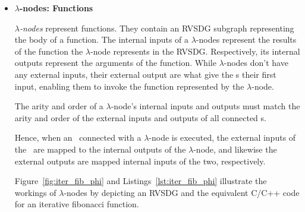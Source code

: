 \begin{itemize}
\item \textbf{$\lambda$-nodes: Functions}

\textit{$\lambda$-nodes} represent functions. They contain an RVSDG subgraph
representing the body of a function. The internal inputs of a $\lambda$-nodes
represent the results of the function the $\lambda$-node represents in the
RVSDG. Respectively, its internal outputs represent the arguments of the
function. While $\lambda$-nodes don't have any external inputs, their external
output are what give the \applyNode s their first input, enabling them to invoke
the function represented by the $\lambda$-node.

The arity and order of a $\lambda$-node's internal inputs and outputs must match
the arity and order of the external inputs and outputs of all connected
\applyNode s.

Hence, when an \applyNode~connected with a $\lambda$-node is executed, the
external inputs of the \applyNode~are mapped to the internal outputs of the
$\lambda$-node, and likewise the external outputs are mapped internal inputs of
the two, respectively.

Figure~\ref{fig:iter_fib_phi} and Listings~\ref{lst:iter_fib_phi} illustrate the
workings of $\lambda$-nodes by depicting an RVSDG and the equivalent C/C++ code
for an iterative fibonacci function.


\end{itemize}
